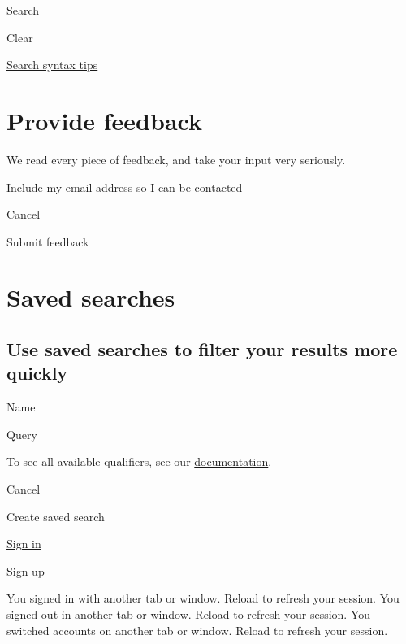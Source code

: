 \documentclass[
  letterpaper,
]{book}
\begin{document}
Search

Clear

\href{https://docs.github.com/search-github/github-code-search/understanding-github-code-search-syntax}{Search
syntax tips}


\chapter{Provide feedback}\label{provide-feedback-1}

We read every piece of feedback, and take your input very seriously.

Include my email address so I can be contacted

Cancel

Submit feedback


\chapter{Saved searches}\label{saved-searches-1}

\section{Use saved searches to filter your results more
quickly}\label{use-saved-searches-to-filter-your-results-more-quickly-1}

Name

Query

To see all available qualifiers, see our
\href{https://docs.github.com/search-github/github-code-search/understanding-github-code-search-syntax}{documentation}.

Cancel

Create saved search

\href{./login?return_to=https\%3A\%2F\%2Fgithub.com\%2Fshionkim\%2FCPS-Demo\%2Fblob\%2Fmain\%2Ftext\%2Fwildkatzenjagd.html}{Sign
in}

\href{./signup?ref_cta=Sign+up&ref_loc=header+logged+out&ref_page=\%2F\%3Cuser-name\%3E\%2F\%3Crepo-name\%3E\%2Fblob\%2Fshow&source=header-repo&source_repo=shionkim\%2FCPS-Demo}{Sign
up}

You signed in with another tab or window. Reload to refresh your
session. You signed out in another tab or window. Reload to refresh your
session. You switched accounts on another tab or window. Reload to
refresh your session.
\end{document}
